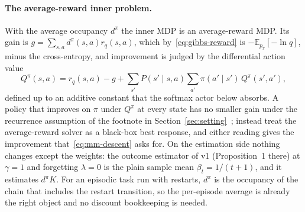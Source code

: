\documentclass[11pt]{article}
\theoremstyle{remark}
\newcommand{\E}{\mathbb E}
\newcommand{\1}{\mathds{1}}
\newcommand{\occ}{d^{\pi}}
\newcommand{\pz}{p_{\pi}}
\newcommand{\new}[1]{\textcolor{blue!70!black}{#1}}
\begin{document}
\paragraph{\new{The average-reward inner problem.}}
{\color{blue!70!black}
With the average occupancy $\occ$ the inner MDP is an average-reward MDP.
Its gain is $g=\sum_{s,a}\occ(s,a)r_q(s,a)$, which by~\eqref{eq:gibbs-reward} is $-\E_{\pz}[-\ln q]$, minus the cross-entropy, and improvement is judged by the differential action value
\begin{equation}
  Q^\pi(s,a)=r_q(s,a)-g+\sum_{s'}P(s'\mid s,a)\sum_{a'}\pi(a'\mid s')\,Q^\pi(s',a'),
  \label{eq:avg-q}
\end{equation}
defined up to an additive constant that the softmax actor below absorbs.
A policy that improves on $\pi$ under $Q^\pi$ at every state has no smaller gain under the recurrence assumption of the footnote in Section~\ref{sec:setting}~\citep[\S8.6]{Puterman-markov94}; \citet{Zahavy-reward21} instead treat the average-reward solver as a black-box best response, and either reading gives the improvement that~\eqref{eq:mm-descent} asks for.
On the estimation side nothing changes except the weights: the outcome estimator of v1 (Proposition~1 there) at $\gamma=1$ and forgetting $\lambda=0$ is the plain sample mean $\beta_t=1/(t+1)$, and it estimates $\occ K$.
For an episodic task run with restarts, $\occ$ is the occupancy of the chain that includes the restart transition, so the per-episode average is already the right object and no discount bookkeeping is needed.
}
\end{document}
